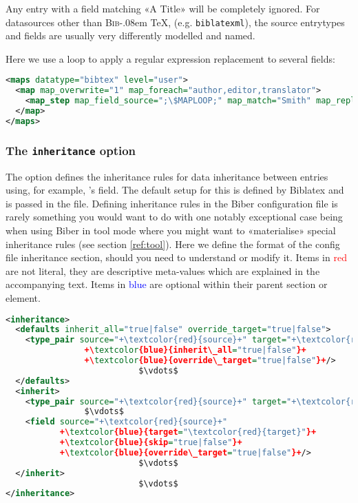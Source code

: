 \documentclass{ltxdockit}
\def\BibTeX{\textsc{Bib}\kern-.08em \TeX}
\newcommand*{\biber}{Biber\xspace}
\newcommand*{\biblatex}{Biblatex\xspace}
\begin{document}
\noindent Any entry with a  field matching «A Title» will
be completely ignored. \bigskip {} For
datasources other than \BibTeX, (e.g. \verb+biblatexml+), the source
entrytypes and fields are usually very differently modelled and named.

\noindent Here we use a loop to apply a regular expression replacement to
several fields:

\begin{lstlisting}[language=xml,escapechar=;,mathescape=true]
<maps datatype="bibtex" level="user">
  <map map_overwrite="1" map_foreach="author,editor,translator">
    <map_step map_field_source=";\$MAPLOOP;" map_match="Smith" map_replace="Jones"/>
  </map>
</maps>
\end{lstlisting}

\bigskip
\subsubsection{The \texttt{inheritance} option}\label{inheritance}

The  option defines the inheritance rules for data
inheritance between entries using, for example, \bibtex's
 field. The default setup for this is defined by
\biblatex and is passed in the  file. Defining inheritance rules
in the \biber configuration file is rarely something you would want to do
with one notably exceptional case being when using \biber in tool mode
where you might want to «materialise» special inheritance rules (see
section \ref{ref:tool}). Here we define the format of the config file
inheritance section, should you need to understand or modify it. Items in
\textcolor{red}{red} are not literal, they are descriptive meta-values
which are explained in the accompanying text. Items in
\textcolor{blue}{blue} are optional within their parent section or element.

\begin{lstlisting}[language=xml,escapechar=+,mathescape=true]
<inheritance>
  <defaults inherit_all="true|false" override_target="true|false">
    <type_pair source="+\textcolor{red}{source}+" target="+\textcolor{red}{target}+"
                +\textcolor{blue}{inherit\_all="true|false"}+
                +\textcolor{blue}{override\_target="true|false"}+/>
                           $\vdots$
  </defaults>
  <inherit>
    <type_pair source="+\textcolor{red}{source}+" target="+\textcolor{red}{target}+"/>
                $\vdots$
    <field source="+\textcolor{red}{source}+"
           +\textcolor{blue}{target="\textcolor{red}{target}"}+
           +\textcolor{blue}{skip="true|false"}+
           +\textcolor{blue}{override\_target="true|false"}+/>
                           $\vdots$
  </inherit>
                           $\vdots$
</inheritance>
\end{lstlisting}
\end{document}
